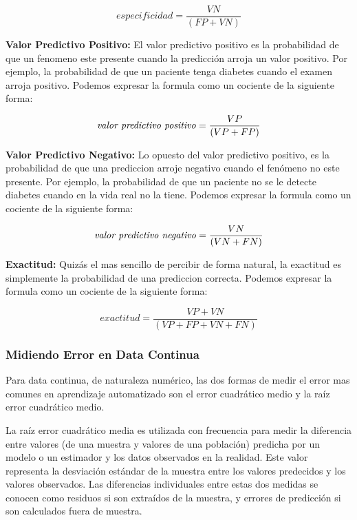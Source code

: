 \begin{equation}
especificidad= \frac{VN}{(FP + VN)}
\end{equation}

\textbf{Valor Predictivo Positivo:} El valor predictivo positivo es la probabilidad de que un fenomeno este presente cuando la predicción arroja un valor positivo. Por ejemplo, la probabilidad de que un paciente tenga diabetes cuando el examen arroja positivo. Podemos expresar la formula como un cociente de la siguiente forma:

\begin{equation}
\mbox{\textit{valor predictivo positivo}} = \frac{VP}{(VP + FP)}
\end{equation}

\textbf{Valor Predictivo Negativo:} Lo opuesto del valor predictivo positivo, es la probabilidad de que una prediccion arroje negativo cuando el fenómeno no este presente. Por ejemplo, la probabilidad de que un paciente no se le detecte diabetes cuando en la vida real no la tiene. Podemos expresar la formula como un cociente de la siguiente forma:

\begin{equation}
\mbox{\textit{valor predictivo negativo}} = \frac{VN}{(VN + FN)}
\end{equation}

\textbf{Exactitud:} Quizás el mas sencillo de percibir de forma natural, la exactitud es simplemente la probabilidad de una prediccion correcta. Podemos expresar la formula como un cociente de la siguiente forma:

\begin{equation}
exactitud = \frac{VP + VN}{(VP + FP + VN + FN)}
\end{equation}

\subsubsection{Midiendo Error en Data Continua}
Para data continua, de naturaleza numérico, las dos formas de medir el error mas comunes en aprendizaje automatizado son el error cuadrático medio y la raíz error cuadrático medio.

La raíz error cuadrático media es utilizada con frecuencia para medir la diferencia entre valores (de una muestra y valores de una población) predicha por un modelo o un estimador y los datos observados en la realidad. Este valor representa la desviación estándar de la muestra entre los valores predecidos y los valores observados. Las diferencias individuales entre estas dos medidas se conocen como residuos si son extraídos de la muestra, y errores de predicción si son calculados fuera de muestra.

